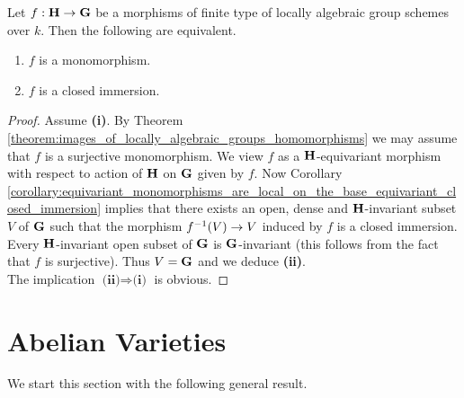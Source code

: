 \begin{corollary}\label{corollary:monomorphisms_of_algebraic_groups}
Let $f:\mathbf{H}\rightarrow \mathbf{G}$ be a morphisms of finite type of locally algebraic group schemes over $k$. Then the following are equivalent.
\begin{enumerate}[label=\emph{\textbf{(\roman*)}}, leftmargin=3.0em]
\item $f$ is a monomorphism.
\item $f$ is a closed immersion.
\end{enumerate}
\end{corollary}
\begin{proof}
Assume \textbf{(i)}. By Theorem \ref{theorem:images_of_locally_algebraic_groups_homomorphisms} we may assume that $f$ is a surjective monomorphism. We view $f$ as a $\mathbf{H}$-equivariant morphism with respect to action of $\mathbf{H}$ on $\mathbf{G}$ given by $f$. Now Corollary \ref{corollary:equivariant_monomorphisms_are_local_on_the_base_equivariant_closed_immersion} implies that there exists an open, dense and $\mathbf{H}$-invariant subset $V$ of $\mathbf{G}$ such that the morphism $f^{-1}(V)\rightarrow V$ induced by $f$ is a closed immersion. Every $\mathbf{H}$-invariant open subset of $\mathbf{G}$ is $\mathbf{G}$-invariant (this follows from the fact that $f$ is surjective). Thus $V = \mathbf{G}$ and we deduce \textbf{(ii)}.\\
The implication $\textbf{(ii)}\Rightarrow \textbf{(i)}$ is obvious.
\end{proof}

\section{Abelian Varieties}
\noindent
We start this section with the following general result.

